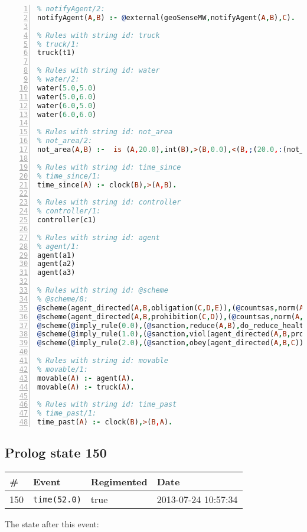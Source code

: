 \documentclass[11pt]{article}\usepackage[utf8]{inputenc}\usepackage{geometry}
\begin{document}
\begin{lstlisting}[language=Prolog, numbers=left]
% Rules with string id: notifyAgent
% notifyAgent/2:
notifyAgent(A,B) :- @external(geoSenseMW,notifyAgent(A,B),C).

% Rules with string id: truck
% truck/1:
truck(t1)

% Rules with string id: water
% water/2:
water(5.0,5.0)
water(5.0,6.0)
water(6.0,5.0)
water(6.0,6.0)

% Rules with string id: not_area
% not_area/2:
not_area(A,B) :-  is (A,20.0),int(B),>(B,0.0),<(B,;(20.0,:(not_area(A,B), is (-(B),20.0)))),int(A),>(A,0.0),<(A,;(20.0,:(area(A,B),-(int(A))))),int(B),>(A,0.0),>(B,0.0),<(A,21.0),<(B,21.0).

% Rules with string id: time_since
% time_since/1:
time_since(A) :- clock(B),>(A,B).

% Rules with string id: controller
% controller/1:
controller(c1)

% Rules with string id: agent
% agent/1:
agent(a1)
agent(a2)
agent(a3)

% Rules with string id: @scheme
% @scheme/8:
@scheme(agent_directed(A,B,obligation(C,D,E)),(@countsas,norm(A,B,F,obligation(C,D,E)),F),false,(listTrue(C)),(time_past(D)),false,[plus(viol(agent_directed(A,B,obligation(C,D,E))))|[]],[plus(obey(agent_directed(A,B,obligation(C,D,E))))|[]])
@scheme(agent_directed(A,B,prohibition(C,D)),(@countsas,norm(A,B,E,prohibition(C,D)),E),(listTrue(C)),false,(false),false,[plus(viol(agent_directed(A,B,prohibition(C,D))))|[]],[plus(obey(agent_directed(A,B,prohibition(C,D))))|[]])
@scheme(@imply_rule(0.0),(@sanction,reduce(A,B),do_reduce_health(A,B),notifyAgent(A,changed(status))),true,false,false,false,[min(reduce(A,B))|[]],[])
@scheme(@imply_rule(1.0),(@sanction,viol(agent_directed(A,B,prohibition(C,D))),do_sanction(D)),true,false,false,false,[min(viol(agent_directed(A,B,prohibition(C,D))))|[]],[])
@scheme(@imply_rule(2.0),(@sanction,obey(agent_directed(A,B,C))),true,false,false,false,[min(obey(agent_directed(A,B,C)))|[]],[])

% Rules with string id: movable
% movable/1:
movable(A) :- agent(A).
movable(A) :- truck(A).

% Rules with string id: time_past
% time_past/1:
time_past(A) :- clock(B),>(B,A).

\end{lstlisting}
\clearpage 
\subsection{Prolog state 150}
\begin{table}[ht]
\centering 
\begin{tabular}{l l l l} 
\textbf{\#} & \textbf{Event} & \textbf{Regimented} & \textbf{Date} \\ [0.5ex] 
\hline
150&\texttt{time(52.0)}&true&2013-07-24 10:57:34\\ [1ex] \hline\end{tabular}
\end{table}
The state after this event:
\end{document}
